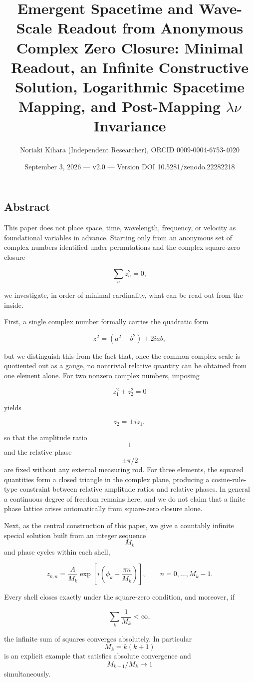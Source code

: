 \documentclass[
  a4paper,
]{article}
\title{Emergent Spacetime and Wave-Scale Readout from Anonymous Complex
Zero Closure: Minimal Readout, an Infinite Constructive Solution,
Logarithmic Spacetime Mapping, and Post-Mapping \(\lambda\nu\)
Invariance}
\author{Noriaki Kihara (Independent Researcher), ORCID
0009-0004-6753-4020}
\date{September 3, 2026 --- v2.0 --- Version DOI
10.5281/zenodo.22282218}
\begin{document}
\maketitle

\subsection{Abstract}\label{abstract}

This paper does not place space, time, wavelength, frequency, or
velocity as foundational variables in advance. Starting only from an
anonymous set of complex numbers identified under permutations and the
complex square-zero closure

\[
\sum_n z_n^2=0,
\]

we investigate, in order of minimal cardinality, what can be read out
from the inside.

First, a single complex number formally carries the quadratic form

\[
z^2=(a^2-b^2)+2iab,
\]

but we distinguish this from the fact that, once the common complex
scale is quotiented out as a gauge, no nontrivial relative quantity can
be obtained from one element alone. For two nonzero complex numbers,
imposing

\[
z_1^2+z_2^2=0
\]

yields

\[
z_2=\pm i z_1,
\]

so that the amplitude ratio \[1\] and the relative phase \[\pm\pi/2\]
are fixed without any external measuring rod. For three elements, the
squared quantities form a closed triangle in the complex plane,
producing a cosine-rule-type constraint between relative amplitude
ratios and relative phases. In general a continuous degree of freedom
remains here, and we do not claim that a finite phase lattice arises
automatically from square-zero closure alone.

Next, as the central construction of this paper, we give a countably
infinite special solution built from an integer sequence \[M_k\] and
phase cycles within each shell,

\[
z_{k,n}
=
\frac{A}{M_k}
\exp\left[i\left(\phi_k+\frac{\pi n}{M_k}\right)\right],
\qquad
n=0,\ldots,M_k-1.
\]

Every shell closes exactly under the square-zero condition, and
moreover, if

\[
\sum_k \frac{1}{M_k}<\infty,
\]

the infinite sum of squares converges absolutely. In particular
\[M_k=k(k+1)\] is an explicit example that satisfies absolute
convergence and \[M_{k+1}/M_k\to1\] simultaneously.
\end{document}
